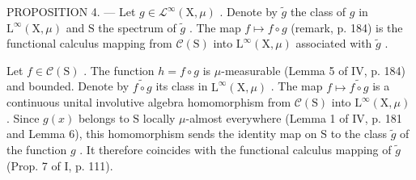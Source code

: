 PROPOSITION 4. --- Let \(g \in \mathcal{L}^{\infty}(\mathrm{X},\mu)\) . Denote by \(\widetilde{g}\) the class of \(g\) in \(\mathrm{L}^{\infty}(\mathrm{X},\mu)\) and \(\mathrm{S}\) the spectrum of \(\widetilde{g}\) . The map \(f \mapsto f \circ g\) (remark, p. 184) is the functional calculus mapping from \(\mathcal{C}(\mathrm{S})\) into \(\mathrm{L}^{\infty}(\mathrm{X},\mu)\) associated with \(\widetilde{g}\) .

Let \(f \in \mathcal{C}(\mathrm{S})\) . The function \(h = f \circ g\) is \(\mu\)-measurable (Lemma 5 of IV, p. 184) and bounded. Denote by \(\widetilde{f \circ g}\) its class in \(\mathrm{L}^{\infty}(\mathrm{X},\mu)\) . The map \(f \mapsto \widetilde{f \circ g}\) is a continuous unital involutive algebra homomorphism from \(\mathcal{C}(\mathrm{S})\) into \(\mathrm{L}^{\infty}(\mathrm{X},\mu)\) . Since \(g(x)\) belongs to \(\mathrm{S}\) locally \(\mu\)-almost everywhere (Lemma 1 of IV, p. 181 and Lemma 6), this homomorphism sends the identity map on \(\mathrm{S}\) to the class \(\widetilde{g}\) of the function \(g\) . It therefore coincides with the functional calculus mapping of \(\widetilde{g}\) (Prop. 7 of I, p. 111).
\relax{}
